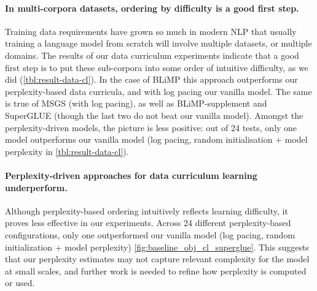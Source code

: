 \paragraph{In multi-corpora datasets, ordering by difficulty is a good first step.}
Training data requirements have grown so much in modern NLP that usually training a language model from scratch will involve multiple datasets, or multiple domains. The results of our data curriculum experiments indicate that a good first step is to put these sub-corpora into some order of intuitive difficulty, as we did (\cref{tbl:result-data-cl}). In the case of BLiMP this approach outperforms our perplexity-based data curricula, and with log pacing our vanilla model. The same is true of MSGS  (with log pacing), as well as BLiMP-supplement and SuperGLUE (though the last two do not beat our vanilla model). 
Amongst the perplexity-driven models, the picture is less positive: out of 24 tests, only one model outperforms our vanilla model (log pacing, random initialisation + model perplexity in \cref{tbl:result-data-cl}).

\paragraph{Perplexity-driven approaches for data curriculum learning underperform.}
Although perplexity-based ordering intuitively reflects learning difficulty, it proves less effective in our experiments. Across 24 different perplexity-based configurations, only one outperformed our vanilla model (log pacing, random initialization + model perplexity) \cref{fig:baseline_obj_cl_superglue}. This suggests that our perplexity estimates may not capture relevant complexity for the model at small scales, and further work is needed to refine how perplexity is computed or used.


